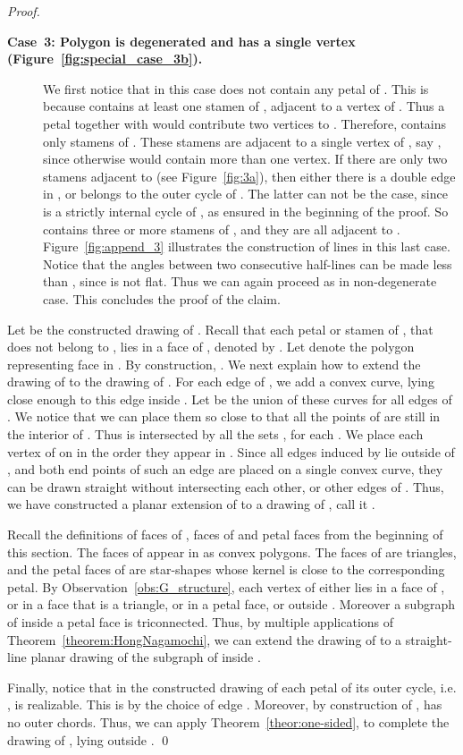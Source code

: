 \documentclass{llncs}
\begin{document}
\begin{proof}
\begin{description}
\item[\bf Case~3: Polygon  is degenerated and has a single vertex (Figure~\ref{fig:special_case_3b}).] 
We first notice that in this case  does not contain any petal of . This is because  contains at least one stamen of , adjacent to a vertex  of . Thus a petal together with  would contribute two vertices to . Therefore,   contains only stamens of . These stamens are adjacent to a single vertex of , say , since otherwise  would contain more than one vertex. If there are only two stamens adjacent to  (see Figure~\ref{fig:3a}), then either there is a double edge in , or  belongs to the outer cycle of . The latter can not be the case, since  is a strictly internal cycle of , as ensured in the beginning of the proof. So   contains three or more stamens  of , and they are all adjacent to .  Figure~\ref{fig:append_3} illustrates the construction of lines  in this last case. Notice that the angles between two consecutive half-lines  can be made less than , since  is not flat. Thus we can again proceed as in non-degenerate case. This concludes the proof of the claim.  
\end{description}
 

Let  be the constructed drawing of . Recall that each petal or stamen  of , that does not belong to , lies in a face of , denoted by . Let  denote the polygon representing face  in . By construction,  . We next explain how to extend the drawing of  to the drawing of .
For each edge  of , we add a convex curve, lying close enough to this edge inside . Let  be the union of these curves for all edges of . We notice that we can place them so close to  that all the points of   are still in the interior of . Thus  is intersected by all the sets , for each . We place  each vertex  of  on  in the order they appear in  . Since all edges induced by  lie outside of , and both end points of such an edge are placed on a single convex curve, they can be drawn straight without intersecting each other, or other edges of . Thus, we have constructed a planar extension of  to a drawing of , call it .

Recall the definitions of faces of , faces of  and petal faces from the beginning of this section. 
The faces of  appear in  as convex polygons. The faces of  are triangles, and the petal faces of  are star-shapes whose kernel is close to the corresponding petal. 
By Observation~\ref{obs:G_structure}, each vertex of  either lies in a face of , or in a face that is a triangle, or in a petal face, or outside . Moreover a subgraph of  inside a petal face is triconnected. Thus, by multiple applications of Theorem~\ref{theorem:HongNagamochi}, we can extend the drawing of  to a straight-line planar drawing of the subgraph of  inside .  

Finally, notice that in the constructed drawing of  each petal of its outer cycle, i.e. , is realizable. This is by the choice of edge . Moreover, by construction of ,  has no outer chords. 
Thus, we can apply Theorem~\ref{theor:one-sided}, to complete the drawing of , lying outside .
\qed
\end{proof}
\end{document}
